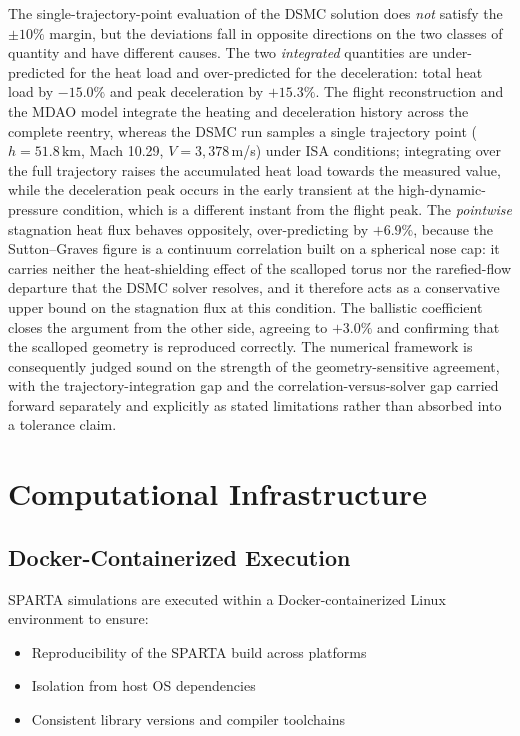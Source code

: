 The single-trajectory-point evaluation of the DSMC solution does \emph{not} satisfy the $\pm 10\%$ margin, but the deviations fall in opposite directions on the two classes of quantity and have different causes. The two \emph{integrated} quantities are under-predicted for the heat load and over-predicted for the deceleration: total heat load by $-15.0\%$ and peak deceleration by $+15.3\%$. The flight reconstruction and the MDAO model integrate the heating and deceleration history across the complete reentry, whereas the DSMC run samples a single trajectory point ($h = 51.8$\,km, Mach 10.29, $V = 3{,}378$\,m/s) under ISA conditions; integrating over the full trajectory raises the accumulated heat load towards the measured value, while the deceleration peak occurs in the early transient at the high-dynamic-pressure condition, which is a different instant from the flight peak. The \emph{pointwise} stagnation heat flux behaves oppositely, over-predicting by $+6.9\%$, because the Sutton--Graves figure is a continuum correlation built on a spherical nose cap: it carries neither the heat-shielding effect of the scalloped torus nor the rarefied-flow departure that the DSMC solver resolves, and it therefore acts as a conservative upper bound on the stagnation flux at this condition. The ballistic coefficient closes the argument from the other side, agreeing to $+3.0\%$ and confirming that the scalloped geometry is reproduced correctly. The numerical framework is consequently judged sound on the strength of the geometry-sensitive agreement, with the trajectory-integration gap and the correlation-versus-solver gap carried forward separately and explicitly as stated limitations rather than absorbed into a tolerance claim.

\section{Computational Infrastructure}

\subsection{Docker-Containerized Execution}
SPARTA simulations are executed within a Docker-containerized Linux environment to ensure:
\begin{itemize}
    \item Reproducibility of the SPARTA build across platforms

    \item Isolation from host OS dependencies

    \item Consistent library versions and compiler toolchains
\end{itemize}

